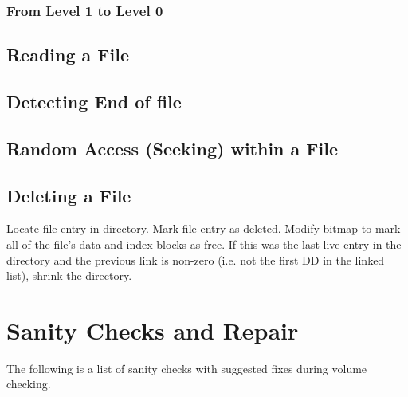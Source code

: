 
\subsubsection{From Level 1 to Level 0}


\subsection{Reading a File}


\subsection{Detecting End of file}


\subsection{Random Access (Seeking) within a File}


\subsection{Deleting a File}

Locate file entry in directory. Mark file entry as deleted. Modify bitmap to
mark all of the file's data and index blocks as free. If this was the last live
entry in the directory and the previous link is non-zero (i.e. not the first
\gls{DD} in the linked list), shrink the directory.

\section{Sanity Checks and Repair}

The following is a list of sanity checks with suggested fixes during volume
checking.


